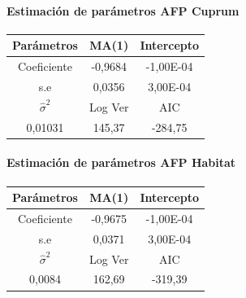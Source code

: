 \paragraph{Estimaci\'on de par\'ametros AFP Cuprum}
\begin{center}
\begin{tabular}{|l|l|l|}
\hline
\multicolumn{1}{|c|}{Par\'ametros} & \multicolumn{1}{c|}{MA(1)} & \multicolumn{1}{c|}{Intercepto} \\
\hline
\multicolumn{1}{|c|}{Coeficiente} & \multicolumn{1}{c|}{-0,9684} & \multicolumn{1}{c|}{-1,00E-04} \\
\hline
\multicolumn{1}{|c|}{s.e} & \multicolumn{1}{c|}{0,0356} & \multicolumn{1}{c|}{3,00E-04} \\
\hline
\multicolumn{1}{|c|}{$\hat{\sigma}^{2}$} & \multicolumn{1}{c|}{Log Ver} & \multicolumn{1}{c|}{AIC} \\
\hline
\multicolumn{1}{|c|}{0,01031} & \multicolumn{1}{c|}{145,37} & \multicolumn{1}{c|}{-284,75} \\
\hline
\end{tabular}
\end{center}
\paragraph{Estimaci\'on de par\'ametros AFP Habitat}
\begin{center}
\begin{tabular}{|l|l|l|}
\hline
\multicolumn{1}{|c|}{Par\'ametros} & \multicolumn{1}{c|}{MA(1)} & \multicolumn{1}{c|}{Intercepto} \\
\hline
\multicolumn{1}{|c|}{Coeficiente} & \multicolumn{1}{c|}{-0,9675} & \multicolumn{1}{c|}{-1,00E-04} \\
\hline
\multicolumn{1}{|c|}{s.e} & \multicolumn{1}{c|}{0,0371} & \multicolumn{1}{c|}{3,00E-04} \\
\hline
\multicolumn{1}{|c|}{$\hat{\sigma}^{2}$} & \multicolumn{1}{c|}{Log Ver} & \multicolumn{1}{c|}{AIC} \\
\hline
\multicolumn{1}{|c|}{0,0084} & \multicolumn{1}{c|}{162,69} & \multicolumn{1}{c|}{-319,39} \\
\hline
\end{tabular}
\end{center}

